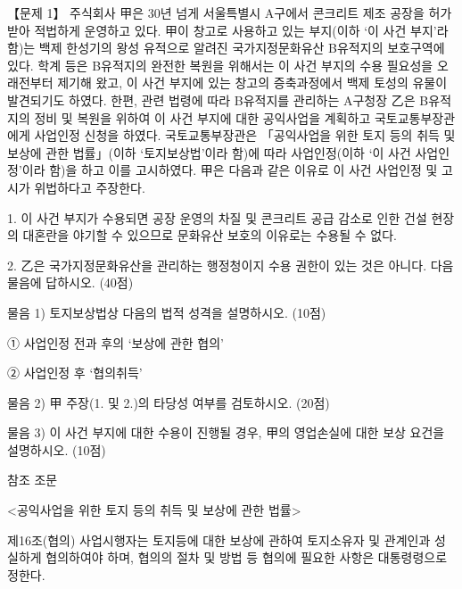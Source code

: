 \begin{longquestion}{【문제 1】}
주식회사 甲은 30년 넘게 서울특별시 A구에서 콘크리트 제조 공장을 허가 받아 적법하게 운영하고 있다. 甲이 창고로 사용하고 있는 부지(이하 ‘이 사건 부지’라 함)는 백제 한성기의 왕성 유적으로 알려진 국가지정문화유산 B유적지의 보호구역에 있다. 학계 등은 B유적지의 완전한 복원을 위해서는 이 사건 부지의 수용 필요성을 오래전부터 제기해 왔고, 이 사건 부지에 있는 창고의 증축과정에서 백제 토성의 유물이 발견되기도 하였다. 한편, 관련 법령에 따라 B유적지를 관리하는 A구청장 乙은 B유적지의 정비 및 복원을 위하여 이 사건 부지에 대한 공익사업을 계획하고 국토교통부장관에게 사업인정 신청을 하였다. 국토교통부장관은 「공익사업을 위한 토지 등의 취득 및 보상에 관한 법률」(이하 ‘토지보상법’이라 함)에 따라 사업인정(이하 ‘이 사건 사업인정’이라 함)을 하고 이를 고시하였다. 甲은 다음과 같은 이유로 이 사건 사업인정 및 고시가 위법하다고 주장한다. \par
1. 이 사건 부지가 수용되면 공장 운영의 차질 및 콘크리트 공급 감소로 인한 건설 현장의 대혼란을 야기할 수 있으므로 문화유산 보호의 이유로는 수용될 수 없다. \par
2. 乙은 국가지정문화유산을 관리하는 행정청이지 수용 권한이 있는 것은 아니다. 다음 물음에 답하시오. (40점) \par
\medskip\noindent 물음 1) 토지보상법상 다음의 법적 성격을 설명하시오. (10점) \par
① 사업인정 전과 후의 ‘보상에 관한 협의’ \par
② 사업인정 후 ‘협의취득’ \par
\medskip\noindent 물음 2) 甲 주장(1. 및 2.)의 타당성 여부를 검토하시오. (20점) \par
\medskip\noindent 물음 3) 이 사건 부지에 대한 수용이 진행될 경우, 甲의 영업손실에 대한 보상 요건을 설명하시오. (10점) \par
\begin{framedtext}
참조 조문 \par
<공익사업을 위한 토지 등의 취득 및 보상에 관한 법률> \par
제16조(협의) 사업시행자는 토지등에 대한 보상에 관하여 토지소유자 및 관계인과 성실하게 협의하여야 하며, 협의의 절차 및 방법 등 협의에 필요한 사항은 대통령령으로 정한다. \par

\end{framedtext}
\end{longquestion}
